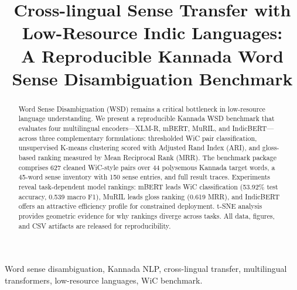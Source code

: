 \documentclass[conference]{IEEEtran}
\begin{document}
\title{Cross-lingual Sense Transfer with Low-Resource Indic Languages:\\
A Reproducible Kannada Word Sense Disambiguation Benchmark}

\author{%
}

\maketitle

\begin{abstract}
Word Sense Disambiguation (WSD) remains a critical bottleneck in low-resource
language understanding. We present a reproducible Kannada WSD benchmark that
evaluates four multilingual encoders---XLM-R, mBERT, MuRIL, and IndicBERT---across
three complementary formulations: thresholded WiC pair classification,
unsupervised K-means clustering scored with Adjusted Rand Index (ARI), and
gloss-based ranking measured by Mean Reciprocal Rank (MRR).
The benchmark package comprises 627 cleaned WiC-style pairs over 44 polysemous
Kannada target words, a 45-word sense inventory with 150 sense entries, and
full result traces.
Experiments reveal task-dependent model rankings: mBERT leads WiC
classification (53.92\% test accuracy, 0.539 macro F1), MuRIL leads gloss
ranking (0.619 MRR), and IndicBERT offers an attractive efficiency profile for
constrained deployment.
t-SNE analysis provides geometric evidence for why rankings diverge across tasks.
All data, figures, and CSV artifacts are released for reproducibility.
\end{abstract}

\begin{IEEEkeywords}
Word sense disambiguation, Kannada NLP, cross-lingual transfer,
multilingual transformers, low-resource languages, WiC benchmark.
\end{IEEEkeywords}
\end{document}
